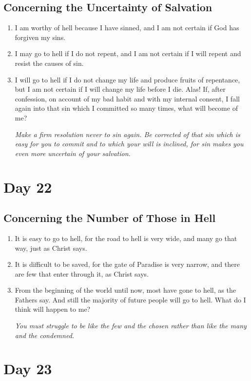 \documentclass[11pt]{article}
\begin{document}
\subsection{Concerning the Uncertainty of Salvation}
\label{sec:org6010ecb}
\begin{enumerate}
\item I am worthy of hell because I have sinned, and I am not certain if God has forgiven my sins.
\item I may go to hell if I do not repent, and I am not certain if I will repent and resist the causes of sin.
\item I will go to hell if I do not change my life and produce fruits of repentance, but I am not certain if I will change my life before I die. Alas!
If, after confession, on account of my bad habit and with my internal consent, I fall again into that sin which I committed so many times, what
will become of me?

\emph{Make a firm resolution never to sin again. Be corrected of that sin which is easy for you to commit and to which your will is inclined, for sin makes}
\emph{you even more uncertain of your salvation.}
\end{enumerate}
\section{Day 22}
\label{sec:org204fada}
\subsection{Concerning the Number of Those in Hell}
\label{sec:org3c7d48b}
\begin{enumerate}
\item It is easy to go to hell, for the road to hell is very wide, and many go that way, just as Christ says.
\item It is difficult to be saved, for the gate of Paradise is very narrow, and there are few that enter through it, as Christ says.
\item From the beginning of the world until now, most have gone to hell, as the Fathers say. And still the majority of future people will go to hell.
What do I think will happen to me?

\emph{You must struggle to be like the few and the chosen rather than like the many and the condemned.}
\end{enumerate}
\section{Day 23}
\label{sec:org6b016f5}
\end{document}
